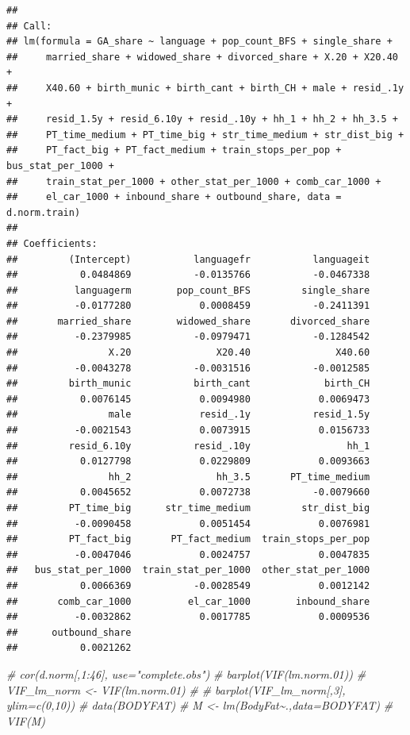 \documentclass[
]{article}
\newenvironment{Shaded}{\begin{snugshade}}{\end{snugshade}}
\newcommand{\CommentTok}[1]{\textcolor[rgb]{0.56,0.35,0.01}{\textit{#1}}}
\begin{document}
\begin{verbatim}
## 
## Call:
## lm(formula = GA_share ~ language + pop_count_BFS + single_share + 
##     married_share + widowed_share + divorced_share + X.20 + X20.40 + 
##     X40.60 + birth_munic + birth_cant + birth_CH + male + resid_.1y + 
##     resid_1.5y + resid_6.10y + resid_.10y + hh_1 + hh_2 + hh_3.5 + 
##     PT_time_medium + PT_time_big + str_time_medium + str_dist_big + 
##     PT_fact_big + PT_fact_medium + train_stops_per_pop + bus_stat_per_1000 + 
##     train_stat_per_1000 + other_stat_per_1000 + comb_car_1000 + 
##     el_car_1000 + inbound_share + outbound_share, data = d.norm.train)
## 
## Coefficients:
##         (Intercept)           languagefr           languageit  
##           0.0484869           -0.0135766           -0.0467338  
##          languagerm        pop_count_BFS         single_share  
##          -0.0177280            0.0008459           -0.2411391  
##       married_share        widowed_share       divorced_share  
##          -0.2379985           -0.0979471           -0.1284542  
##                X.20               X20.40               X40.60  
##          -0.0043278           -0.0031516           -0.0012585  
##         birth_munic           birth_cant             birth_CH  
##           0.0076145            0.0094980            0.0069473  
##                male            resid_.1y           resid_1.5y  
##          -0.0021543            0.0073915            0.0156733  
##         resid_6.10y           resid_.10y                 hh_1  
##           0.0127798            0.0229809            0.0093663  
##                hh_2               hh_3.5       PT_time_medium  
##           0.0045652            0.0072738           -0.0079660  
##         PT_time_big      str_time_medium         str_dist_big  
##          -0.0090458            0.0051454            0.0076981  
##         PT_fact_big       PT_fact_medium  train_stops_per_pop  
##          -0.0047046            0.0024757            0.0047835  
##   bus_stat_per_1000  train_stat_per_1000  other_stat_per_1000  
##           0.0066369           -0.0028549            0.0012142  
##       comb_car_1000          el_car_1000        inbound_share  
##          -0.0032862            0.0017785            0.0009536  
##      outbound_share  
##           0.0021262
\end{verbatim}

\begin{Shaded}
\begin{Highlighting}[]
\CommentTok{\# cor(d.norm[,1:46], use="complete.obs")}
\CommentTok{\# barplot(VIF(lm.norm.01))}
\CommentTok{\# VIF\_lm\_norm \textless{}{-} VIF(lm.norm.01)}
\CommentTok{\# }
\CommentTok{\# barplot(VIF\_lm\_norm[,3], ylim=c(0,10))}
\CommentTok{\# data(BODYFAT)}
\CommentTok{\#   M \textless{}{-} lm(BodyFat\textasciitilde{}.,data=BODYFAT)}
\CommentTok{\#   VIF(M)}
\end{Highlighting}
\end{Shaded}
\end{document}

